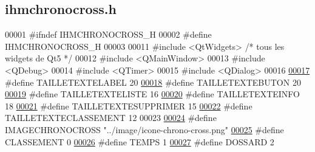 \hypertarget{ihmchronocross_8h_source}{}\subsection{ihmchronocross.\+h}
\label{ihmchronocross_8h_source}

\begin{DoxyCode}
00001 \textcolor{preprocessor}{#ifndef IHMCHRONOCROSS\_H}
00002 \textcolor{preprocessor}{#define IHMCHRONOCROSS\_H}
00003 
00011 \textcolor{preprocessor}{#include <QtWidgets>} \textcolor{comment}{/* tous les widgets de Qt5 */}
00012 \textcolor{preprocessor}{#include <QMainWindow>}
00013 \textcolor{preprocessor}{#include <QDebug>}
00014 \textcolor{preprocessor}{#include <QTimer>}
00015 \textcolor{preprocessor}{#include <QDialog>}
00016 
\hyperlink{ihmchronocross_8h_a407f067284fd7ac16426ac29cbfcd356}{00017} \textcolor{preprocessor}{#define TAILLETEXTELABEL        20}
\hyperlink{ihmchronocross_8h_a93c1a7628e080979c2ae8f83b6c69606}{00018} \textcolor{preprocessor}{#define TAILLETEXTEBUTON        20}
\hyperlink{ihmchronocross_8h_a4169235bca6fe9370d9b368912e62af0}{00019} \textcolor{preprocessor}{#define TAILLETEXTELISTE        16}
\hyperlink{ihmchronocross_8h_a93033547a126f30c05119d40b51384da}{00020} \textcolor{preprocessor}{#define TAILLETEXTEINFO         18}
\hyperlink{ihmchronocross_8h_a79ebe381f5864a987975ff0072b37ae7}{00021} \textcolor{preprocessor}{#define TAILLETEXTESUPPRIMER    15}
\hyperlink{ihmchronocross_8h_ad9c2b9995bc14e73ab20cdd74252126d}{00022} \textcolor{preprocessor}{#define TAILLETEXTECLASSEMENT   12}
00023 
\hyperlink{ihmchronocross_8h_aa8bee638aa78f9b332485225ecc8e75e}{00024} \textcolor{preprocessor}{#define IMAGECHRONOCROSS "../image/icone-chrono-cross.png"}
\hyperlink{ihmchronocross_8h_a042b3fb5b102c16d90d2d9ad6d76b8de}{00025} \textcolor{preprocessor}{#define CLASSEMENT       0}
\hyperlink{ihmchronocross_8h_ad67b7981a5b5c479cd25328af2db4a3a}{00026} \textcolor{preprocessor}{#define TEMPS            1}
\hyperlink{ihmchronocross_8h_a4d7a994c9b4a9bbef72bf043736e9481}{00027} \textcolor{preprocessor}{#define DOSSARD          2}

\end{DoxyCode}
